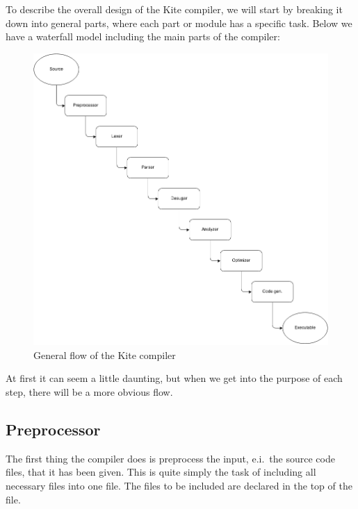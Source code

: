 
To describe the overall design of the Kite compiler, we will start by
breaking it down into general parts, where each part or module has a
specific task. Below we have a waterfall model including the main
parts of the compiler:

\begin{figure}[H]
  \centering
  \includegraphics[scale=0.45]{images/flow.png}
  \caption{General flow of the Kite compiler}
\label{fig:flow}
\end{figure}

At first it can seem a little daunting, but when we get into the
purpose of each step, there will be a more obvious flow.


\subsection{Preprocessor}
The first thing the compiler does is preprocess the input, e.i.\ the source code files, that it has been given. This is quite simply the task of including all necessary files into one file. The files to be included are declared in the top of the file.

